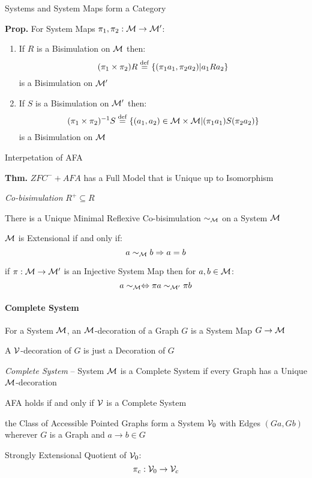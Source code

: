 Systems and System Maps form a Category %

\textbf{Prop.} For System Maps $\pi_1,\pi_2 : \mathcal{M} \rightarrow
\mathcal{M}'$:
\begin{enumerate}
  \item If $R$ is a Bisimulation on $\mathcal{M}$ then:
    \[
      (\pi_1 \times \pi_2) R
        \stackrel{\mathrm{def}}= \{(\pi_1 a_1, \pi_2 a_2) | a_1 R a_2\}
    \]
    is a Bisimulation on $\mathcal{M}'$
  \item If $S$ is a Bisimulation on $\mathcal{M}'$ then:
    \[
      (\pi_1 \times \pi_2)^{-1}S
        \stackrel{\mathrm{def}}= \{(a_1,a_2) \in \mathcal{M} \times \mathcal{M}
        | (\pi_1 a_1) S (\pi_2 a_2)\}
    \]
    is a Bisimulation on $\mathcal{M}$
\end{enumerate}

Interpetation of AFA %

\textbf{Thm.} $ZFC^- + AFA$ has a Full Model that is Unique up to
Isomorphism

\emph{Co-bisimulation} $R^+ \subseteq R$

There is a Unique Minimal Reflexive Co-bisimulation $\sim_\mathcal{M}$
on a System $\mathcal{M}$

$\mathcal{M}$ is Extensional if and only if:
\[
  a \sim_\mathcal{M} b \Rightarrow a = b
\]

if $\pi : \mathcal{M} \rightarrow \mathcal{M}'$ is an Injective System Map
then for $a,b \in \mathcal{M}$:
\[
  a \sim_\mathcal{M} \Leftrightarrow \pi a \sim_{\mathcal{M}'} \pi b
\]



\paragraph{Complete System}\label{sec:complete_system}\hfill

For a System $\mathcal{M}$, an $\mathcal{M}$-decoration of a Graph $G$ is
a System Map $G \rightarrow \mathcal{M}$

A $\mathcal{V}$-decoration of $G$ is just a Decoration of $G$

\emph{Complete System} -- System $\mathcal{M}$ is a Complete System if
every Graph has a Unique $\mathcal{M}$-decoration

AFA holds if and only if $\mathcal{V}$ is a Complete System

the Class of Accessible Pointed Graphs form a System $\mathcal{V}_0$
with Edges $(G a, G b)$ wherever $G$ is a Graph and $a \rightarrow b
\in G$

Strongly Extensional Quotient of $\mathcal{V}_0$:
\[
  \pi_c : \mathcal{V}_0 \rightarrow \mathcal{V}_c
\]


